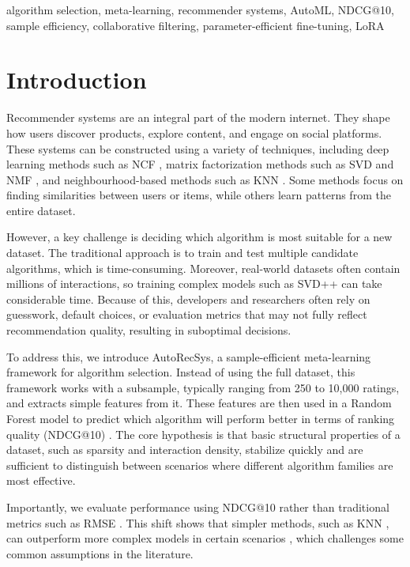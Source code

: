 \documentclass[conference]{IEEEtran}
\begin{document}
\begin{IEEEkeywords}
algorithm selection, meta-learning, recommender systems, AutoML, NDCG@10, sample efficiency, collaborative filtering, parameter-efficient fine-tuning, LoRA
\end{IEEEkeywords}

\section{Introduction}

Recommender systems are an integral part of the modern internet. They shape how users discover products, explore content, and engage on social platforms. These systems can be constructed using a variety of techniques, including deep learning methods such as NCF \cite{he2017ncf}, matrix factorization methods such as SVD and NMF \cite{koren2009matrix}, and neighbourhood-based methods such as KNN \cite{sarwar2001item}. Some methods focus on finding similarities between users or items, while others learn patterns from the entire dataset.

However, a key challenge is deciding which algorithm is most suitable for a new dataset. The traditional approach is to train and test multiple candidate algorithms, which is time-consuming. Moreover, real-world datasets often contain millions of interactions, so training complex models such as SVD++ \cite{koren2008factorization} can take considerable time. Because of this, developers and researchers often rely on guesswork, default choices, or evaluation metrics that may not fully reflect recommendation quality, resulting in suboptimal decisions.

To address this, we introduce AutoRecSys, a sample-efficient meta-learning framework for algorithm selection. Instead of using the full dataset, this framework works with a subsample, typically ranging from 250 to 10,000 ratings, and extracts simple features from it. These features are then used in a Random Forest model to predict which algorithm will perform better in terms of ranking quality (NDCG@10) \cite{jarvelin2002ndcg}. The core hypothesis is that basic structural properties of a dataset, such as sparsity and interaction density, stabilize quickly and are sufficient to distinguish between scenarios where different algorithm families are most effective.

Importantly, we evaluate performance using NDCG@10 \cite{jarvelin2002ndcg} rather than traditional metrics such as RMSE \cite{koren2009matrix}. This shift shows that simpler methods, such as KNN \cite{sarwar2001item}, can outperform more complex models in certain scenarios \cite{cremonesi2010performance}, which challenges some common assumptions in the literature.
\end{document}
